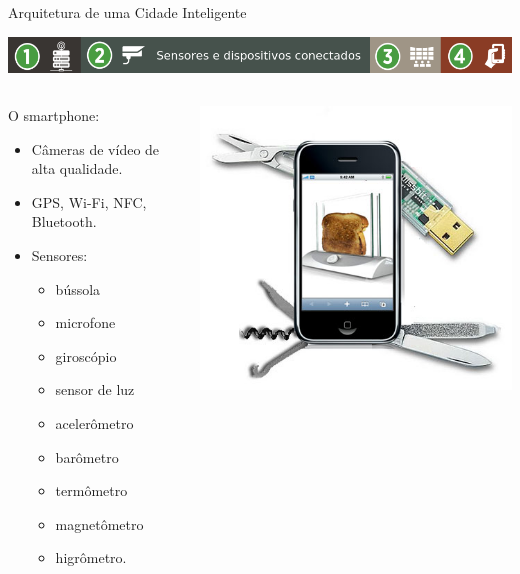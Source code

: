 \documentclass{beamer}
\begin{document}
\begin{frame}{Arquitetura de uma Cidade Inteligente}
\begin{center}
\includegraphics[width=1\textwidth]{img/arquitetura-menu-2.png}  
\end{center}

\begin{columns}
\begin{column}{0.6\textwidth}
\begin{block}{O  smartphone:}
\begin{itemize}
 \item Câmeras de vídeo de alta qualidade.
 \item GPS, Wi-Fi, NFC, Bluetooth.
 \item Sensores:
\begin{itemize}
 \item bússola 
 \item microfone
 \item giroscópio
 \item sensor de luz
 \item acelerômetro
 \item barômetro
 \item termômetro
 \item magnetômetro
 \item higrômetro.
 
\end{itemize}
 
\end{itemize}
\end{block}
\end{column}
\begin{column}{0.4\textwidth}
 \includegraphics[width=1\textwidth]{img/multiusos.jpg}
\end{column}
\end{columns}
\end{frame}
\end{document}
